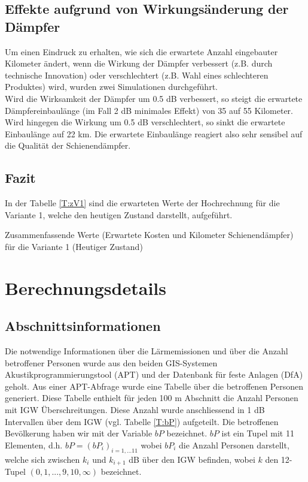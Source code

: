 \subsection{Effekte aufgrund von Wirkungsänderung der Dämpfer}
Um einen Eindruck zu erhalten, wie sich die erwartete Anzahl eingebauter Kilometer ändert, wenn die Wirkung der Dämpfer verbessert (z.B. durch technische Innovation) oder verschlechtert (z.B. Wahl eines schlechteren Produktes) wird, wurden zwei Simulationen durchgeführt. \\

Wird die Wirksamkeit der Dämpfer um 0.5 dB verbessert, so steigt die erwartete Dämpfereinbaulänge (im Fall 2 dB minimales Effekt) von 35 auf 55 Kilometer.  Wird hingegen die Wirkung um 0.5 dB verschlechtert, so sinkt die erwartete Einbaulänge auf 22 km. Die erwartete Einbaulänge reagiert also sehr sensibel auf die Qualität der Schienendämpfer.

\subsection{Fazit}
In der Tabelle \ref{T:zV1} sind die erwarteten Werte der Hochrechnung für die Variante 1, welche den heutigen Zustand darstellt, aufgeführt. 
\begin{table}[!htb]
	\begin{center}
	
	\caption{Zusammenfassende Werte (Erwartete Kosten und Kilometer Schienendämpfer) für die Variante 1 (Heutiger Zustand)}
	\label{T:zV1}
	\end{center}
\end{table}

\clearpage
\section{Berechnungsdetails}\label{SS:det}
\subsection{Abschnittsinformationen}
Die notwendige Informationen über die Lärmemissionen und über die Anzahl betroffener Personen wurde aus den beiden GIS-Systemen Akustikprogrammierungstool (APT) und der Datenbank für feste Anlagen (DfA) geholt. Aus einer APT-Abfrage wurde eine Tabelle über die betroffenen Personen generiert. Diese Tabelle enthielt für jeden 100 m Abschnitt die Anzahl Personen mit IGW Überschreitungen. Diese Anzahl wurde anschliessend in 1 dB Intervallen über dem IGW (vgl. Tabelle \ref{T:bP}) aufgeteilt. Die betroffenen Bevölkerung haben wir mit der Variable $bP$ bezeichnet. $bP$ ist ein Tupel mit 11 Elementen, d.h. $bP =(bP_i)_{i=1,...11}$ wobei $bP_i$ die Anzahl Personen darstellt, welche sich zwischen $k_{i}$ und $k_{i+1}$ dB über den IGW befinden, wobei $k$ den 12-Tupel $(0,1,...,9,10,\infty)$ bezeichnet.\\

